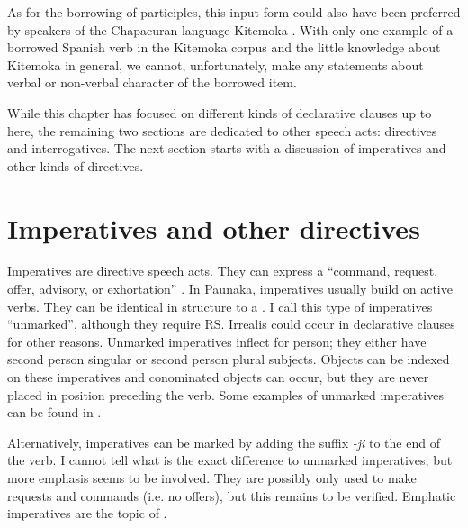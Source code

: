 As for the borrowing of participles, this input form could also have been preferred by speakers of the Chapacuran language Kitemoka \citep[cf. ex. KIT1 739 in][96]{Wienold2012}. With only one example of a borrowed Spanish verb in the Kitemoka corpus and the little knowledge about Kitemoka in general, we cannot, unfortunately, make any statements about verbal or non-verbal character of the borrowed item.

While this chapter has focused on different kinds of declarative clauses up to here, the remaining two sections are dedicated to other speech acts: directives and interrogatives. The next section starts with a discussion of imperatives and other kinds of directives.



\section{Imperatives and other directives}\label{sec:Imperative}

Imperatives are directive speech acts. They can express a “command, request, offer, advisory, or exhortation” \citep[277]{Koenig2007}. In Paunaka, imperatives usually build on active verbs. They can be identical in structure to a . I call this type of imperatives “unmarked”, although they require  RS. Irrealis could occur in declarative clauses for other reasons. Unmarked imperatives inflect for person; they either have second person singular or second person plural subjects. Objects can be indexed on these imperatives and conominated objects can occur, but they are never placed in  position preceding the verb.  Some examples of unmarked imperatives can be found in . %

Alternatively, imperatives can be marked by adding the suffix \textit{-ji} to the end of the verb. I cannot tell what is the exact difference to unmarked imperatives, but more emphasis seems to be involved. They are possibly only used to make requests and commands (i.e. no offers), but this remains to be verified. Emphatic imperatives are the topic of . 

